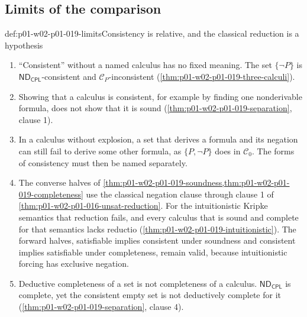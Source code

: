 \subsection{Limits of the comparison}
\label{sec:p01-w02-p01-019-limits}

\begin{hbwarning}{def:p01-w02-p01-019-limits}{Consistency is relative, and the classical reduction is a hypothesis}
\begin{enumerate}
  \item ``Consistent'' without a named calculus has no fixed meaning. The set
        \(\{\neg P\}\) is \(\mathsf{ND}_{\mathsf{CPL}}\)-consistent and
        \(\mathcal C_P\)-inconsistent
        (\cref{thm:p01-w02-p01-019-three-calculi}).
  \item Showing that a calculus is consistent, for example by finding one
        nonderivable formula, does not show that it is sound
        (\cref{thm:p01-w02-p01-019-separation}, clause 1).
  \item In a calculus without explosion, a set that derives a formula and its
        negation can still fail to derive some other formula, as
        \(\{P,\neg P\}\) does in \(\mathcal C_0\). The forms of consistency
        must then be named separately.
  \item The converse halves of
        \cref{thm:p01-w02-p01-019-soundness,thm:p01-w02-p01-019-completeness}
        use the classical negation clause through clause 1 of
        \cref{thm:p01-w02-p01-016-unsat-reduction}. For the intuitionistic
        Kripke semantics that reduction fails, and every calculus that is
        sound and complete for that semantics lacks reductio
        (\cref{thm:p01-w02-p01-019-intuitionistic}). The forward halves,
        satisfiable implies consistent under soundness and consistent implies
        satisfiable under completeness, remain valid, because intuitionistic
        forcing has exclusive negation.
  \item Deductive completeness of a set is not completeness of a calculus.
        \(\mathsf{ND}_{\mathsf{CPL}}\) is complete, yet the consistent empty
        set is not deductively complete for it
        (\cref{thm:p01-w02-p01-019-separation}, clause 4).
\end{enumerate}
\end{hbwarning}

